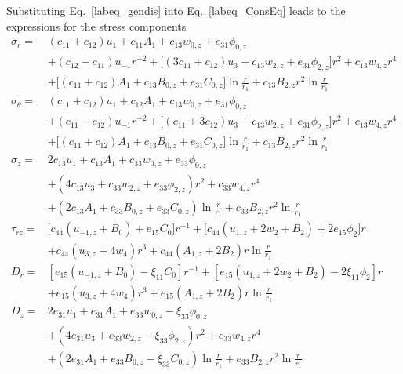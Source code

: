 \documentclass[12pt,sort&compress,fleqn,3p]{elsarticle}
\newcommand{\jiaobiao}[2]{ {#1} _ {#2} }
\newcommand{\er}[4]{{#1}_{#2}{#3}_{#4}}
\newcommand{\de}[5]{{#1}_{#2}{#3}_{{#4},{#5}}}
\begin{document}
Substituting Eq.~\eqref{labeq_gendis} into Eq.~\eqref{labeq_ConsEq} leads to the expressions for the stress components
\begin{equation}\label{labeq_stress}
\begin{split}
\sigma_{r} =&(\jiaobiao{c}{11}+\jiaobiao{c}{12})\jiaobiao{u}{1}+\er{c}{11}{A}{1}+c_{13}w_{0,z}+\de{e}{31}{\phi}{0}{z}\\
&+(\jiaobiao{c}{12}-\jiaobiao{c}{11})\jiaobiao{u}{-1}r^{-2}+\big[(3\jiaobiao{c}{11}+\jiaobiao{c}{12})\jiaobiao{u}{3}+\de{c}{13}{w}{2}{z}+\de{e}{31}{\phi}{2}{z}\big]r^{2}+\de{c}{13}{w}{4}{z}r^{4}\\
&+\big[(c_{11}+c_{12})A_{1}+c_{13}B_{0,z}+\de{e}{31}{C}{0}{z}\big]\ln\frac{r}{r_1}+\de{c}{13}{B}{2}{z}r^{2}\ln\frac{r}{r_1} \\[7pt]
\sigma_{\theta}=&(\jiaobiao{c}{11}+\jiaobiao{c}{12})\jiaobiao{u}{1}+\er{c}{12}{A}{1}+c_{13}w_{0,z}+\de{e}{31}{\phi}{0}{z}\\
&+(\jiaobiao{c}{11}-\jiaobiao{c}{12})\jiaobiao{u}{-1}r^{-2}+\big[(\jiaobiao{c}{11}+3\jiaobiao{c}{12})\jiaobiao{u}{3}+\de{c}{13}{w}{2}{z}+\de{e}{31}{\phi}{2}{z}\big]r^{2}+\de{c}{13}{w}{4}{z}r^{4}\\
&+\big[(c_{11}+c_{12})A_{1}+c_{13}B_{0,z}+\de{e}{31}{C}{0}{z}\big]\ln\frac{r}{r_1}+\de{c}{13}{B}{2}{z}r^{2}\ln\frac{r}{r_1}\\[7pt]
\sigma_{z}=&2\er{c}{13}{u}{1}+\er{c}{13}{A}{1}+c_{33}w_{0,z}+\de{e}{33}{\phi}{0}{z}\\
&+(4\er{c}{13}{u}{3}+c_{33}w_{2,z}+\de{e}{33}{\phi}{2}{z})r^{2}+\de{c}{33}{w}{4}{z}r^{4}\\
&+(2\er{c}{13}{A}{1}+c_{33}B_{0,z}+\de{e}{33}{C}{0}{z})\ln\frac{r}{r_1}  +c_{33}B_{2,z} r^2 \ln\frac{r}{r_1}      \\[7pt]
\tau_{rz}=&\big[c_{44}(u_{-1,z}+B_{0})+\er{e}{15}{C}{0}\big]r^{-1} + \big[c_{44}(u_{1,z}+2w_{2}+B_{2})+2\er{e}{15}{\phi}{2}\big]r\\
&+c_{44}(u_{3,z}+4w_{4})r^{3}+c_{44}(A_{1,z}+2B_{2})r\ln\frac{r}{r_1}\\
D_{r}=& [e_{15}(u_{-1,z}+B_{0})-\er{\xi}{11}{C}{0}]r^{-1}+ [e_{15}(u_{1,z}+2w_{2}+B_{2})-2\er{\xi}{11}{\phi}{2}]r\\
&+e_{15}(u_{3,z}+4w_{4})r^{3} +e_{15}(A_{1,z}+2B_{2})r\ln\frac{r}{r_1}\\
D_{z}=&2e_{31}u_{1}+e_{31}A_{1}+\de{e}{33}{w}{0}{z}-\de{\xi}{33}{\phi}{0}{z}\\
&+(4e_{31}u_{3}+\de{e}{33}{w}{2}{z}-\de{\xi}{33}{\phi}{2}{z})r^{2}+\de{e}{33}{w}{4}{z}r^{4}\\
&+(2\er{e}{31}{A}{1}+\de{e}{33}{B}{0}{z}-\de{\xi}{33}{C}{0}{z})\ln\frac{r}{r_1}+\de{e}{33}{B}{2}{z}r^{2}\ln\frac{r}{r_1}
\end{split}
\end{equation}
\end{document}
